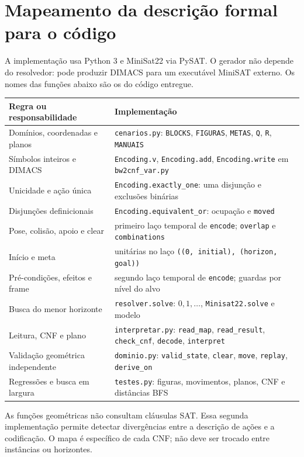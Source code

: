 \documentclass[11pt,a4paper]{article}
\begin{document}
\section{Mapeamento da descrição formal para o código}
A implementação usa Python 3 e MiniSat22 via PySAT. O gerador não depende do resolvedor: pode produzir DIMACS para um executável MiniSAT externo. Os nomes das funções abaixo são os do código entregue.
\begin{center}\small
\begin{tabular}{@{}p{.40\linewidth}p{.56\linewidth}@{}}\toprule
Regra ou responsabilidade & Implementação\\\midrule
Domínios, coordenadas e planos & \texttt{cenarios.py}: \texttt{BLOCKS}, \texttt{FIGURAS}, \texttt{METAS}, \texttt{Q}, \texttt{R}, \texttt{MANUAIS}\\
Símbolos inteiros e DIMACS & \texttt{Encoding.v}, \texttt{Encoding.add}, \texttt{Encoding.write} em \texttt{bw2cnf\_var.py}\\
Unicidade e ação única & \texttt{Encoding.exactly\_one}: uma disjunção e exclusões binárias\\
Disjunções definicionais & \texttt{Encoding.equivalent\_or}: ocupação e \texttt{moved}\\
Pose, colisão, apoio e clear & primeiro laço temporal de \texttt{encode}; \texttt{overlap} e \texttt{combinations}\\
Início e meta & unitárias no laço \texttt{((0, initial), (horizon, goal))}\\
Pré-condições, efeitos e frame & segundo laço temporal de \texttt{encode}; guardas por nível do alvo\\
Busca do menor horizonte & \texttt{resolver.solve}: $0,1,\ldots$, \texttt{Minisat22.solve} e modelo\\
Leitura, CNF e plano & \texttt{interpretar.py}: \texttt{read\_map}, \texttt{read\_result}, \texttt{check\_cnf}, \texttt{decode}, \texttt{interpret}\\
Validação geométrica independente & \texttt{dominio.py}: \texttt{valid\_state}, \texttt{clear}, \texttt{move}, \texttt{replay}, \texttt{derive\_on}\\
Regressões e busca em largura & \texttt{testes.py}: figuras, movimentos, planos, CNF e distâncias BFS\\\bottomrule
\end{tabular}\end{center}
As funções geométricas não consultam cláusulas SAT. Essa segunda implementação permite detectar divergências entre a descrição de ações e a codificação. O mapa é específico de cada CNF; não deve ser trocado entre instâncias ou horizontes.
\end{document}
